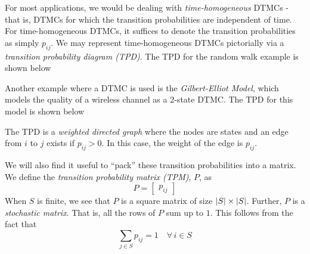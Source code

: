 \documentclass[12pt]{article}
\theoremstyle{definition}
\begin{document}
\medskip

For most applications, we would be dealing with \emph{time-homogeneous} DTMCs - that is, DTMCs for which the transition probabilities are independent of time. For time-homogeneous DTMCs, it suffices to denote the transition probabilities as simply $p_{ij}$. We may represent time-homogeneous DTMCs pictorially via a \emph{transition probability diagram (TPD)}. The TPD for the random walk example is shown below

\begin{center}
\end{center}

Another example where a DTMC is used is the \emph{Gilbert-Elliot Model}, which models the quality of a wireless channel as a $2$-state DTMC. The TPD for this model is shown below

\begin{center}
\end{center}

The TPD is a \emph{weighted directed graph} where the nodes are states and an edge from $i$ to $j$ exists if $p_{ij} > 0$. In this case, the weight of the edge is $p_{ij}$.

\medskip

We will also find it useful to ``pack'' these transition probabilities into a matrix. We define the \emph{transition probability matrix (TPM)}, $P$, as
\[
    P = \begin{bmatrix}
        p_{ij}
    \end{bmatrix}
\]
When $S$ is finite, we see that $P$ is a square matrix of size $\abs{S} \times \abs{S}$. Further, $P$ is a \emph{stochastic matrix}. That is, all the rows of $P$ sum up to $1$. This follows from the fact that
\[
    \sum_{j \in S} p_{ij} = 1 \quad \forall \, i \in S
\]
\end{document}
